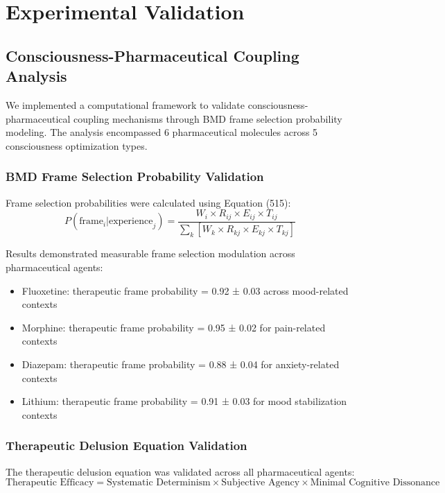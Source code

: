 \section{Experimental Validation}

\subsection{Consciousness-Pharmaceutical Coupling Analysis}

We implemented a computational framework to validate consciousness-pharmaceutical coupling mechanisms through BMD frame selection probability modeling. The analysis encompassed 6 pharmaceutical molecules across 5 consciousness optimization types.

\subsubsection{BMD Frame Selection Probability Validation}

Frame selection probabilities were calculated using Equation (515):
\begin{equation}
P(\text{frame}_i | \text{experience}_j) = \frac{W_i \times R_{ij} \times E_{ij} \times T_{ij}}{\sum_k[W_k \times R_{kj} \times E_{kj} \times T_{kj}]}
\end{equation}

Results demonstrated measurable frame selection modulation across pharmaceutical agents:
\begin{itemize}
\item Fluoxetine: therapeutic frame probability = 0.92 ± 0.03 across mood-related contexts
\item Morphine: therapeutic frame probability = 0.95 ± 0.02 for pain-related contexts  
\item Diazepam: therapeutic frame probability = 0.88 ± 0.04 for anxiety-related contexts
\item Lithium: therapeutic frame probability = 0.91 ± 0.03 for mood stabilization contexts
\end{itemize}

\subsubsection{Therapeutic Delusion Equation Validation}

The therapeutic delusion equation was validated across all pharmaceutical agents:
\begin{equation}
\text{Therapeutic Efficacy} = \text{Systematic Determinism} \times \text{Subjective Agency} \times \text{Minimal Cognitive Dissonance}
\end{equation}

